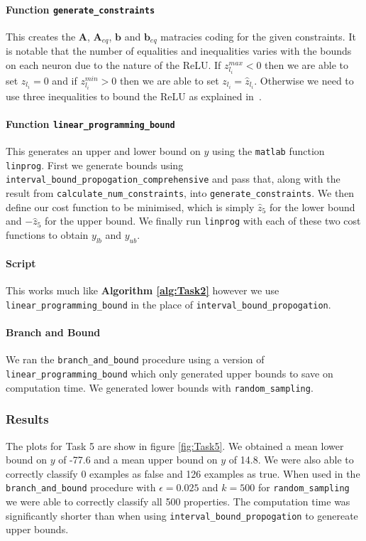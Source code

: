 \documentclass[11pt]{article}
\begin{document}
\paragraph{Function \texttt{generate\_constraints}} 
This creates the $\boldsymbol{A}$, $\boldsymbol{A}_{eq}$, $\boldsymbol{b}$ and $\boldsymbol{b}_{eq}$ matracies coding for the given constraints.
It is notable that the number of equalities and inequalities varies with the bounds on each neuron due to the nature of the ReLU. 
If $z^{max}_{l_i}<0$ then we are able to set $z_{l_i}=0$ and if $z^{min}_{l_i}>0$ then we are able to set $z_{l_i}=\hat{z}_{l_i}$. 
Otherwise we need to use three inequalities to bound the ReLU as explained in~\cite{NNVNotes}.

\paragraph{Function \texttt{linear\_programming\_bound}} This generates an upper and lower bound on $y$ using the \texttt{matlab} function \texttt{linprog}. 
First we generate bounds using \texttt{interval\_bound\_propogation\_comprehensive} and pass that, along with the result from \texttt{calculate\_num\_constraints}, into \texttt{generate\_constraints}.
We then define our cost function to be minimised, which is simply $\hat{z}_5$ for the lower bound and $-\hat{z}_5$ for the upper bound. 
We finally run \texttt{linprog} with each of these two cost functions to obtain $y_{lb}$ and $y_{ub}$.

\paragraph{Script} This works much like \textbf{Algorithm \ref{alg:Task2}} however we use \texttt{linear\_programming\_bound} in the place of \texttt{interval\_bound\_propogation}.

\paragraph{Branch and Bound} We ran the \texttt{branch\_and\_bound} procedure using a version of \texttt{linear\_programming\_bound} which only generated upper bounds to save on computation time. We generated lower bounds with \texttt{random\_sampling}.
\subsubsection{Results}
The plots for Task 5 are show in figure \ref{fig:Task5}. 
We obtained a mean lower bound on $y$ of -77.6 and a mean upper bound on $y$ of 14.8. 
We were also able to correctly classify 0 examples as false and 126 examples as true. 
When used in the \texttt{branch\_and\_bound} procedure with $\epsilon=0.025$ and $k=500$ for \texttt{random\_sampling} we were able to correctly classify all 500 properties. 
The computation time was significantly shorter than when using \texttt{interval\_bound\_propogation} to genereate upper bounds.
\end{document}
